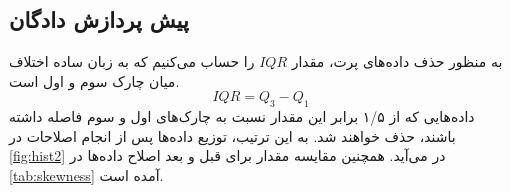 \documentclass[11pt]{article}
\begin{document}
	\subsection{پیش پردازش دادگان}
	به منظور حذف داده‌های پرت، مقدار $IQR$ را حساب می‌کنیم که به زبان ساده اختلاف میان چارک سوم و اول است.
	\begin{equation}
		IQR = Q_3 - Q_1
	\end{equation}
	داده‌هایی که از ۱/۵ برابر این مقدار نسبت به چارک‌های اول و سوم فاصله داشته باشند، حذف خواهند شد. به این ترتیب، توزیع داده‌ها پس از انجام اصلاحات در
	\autoref{fig:hist2}
	در می‌آید. همچنین مقایسه مقدار  برای قبل و بعد اصلاح داده‌ها در 
	\autoref{tab:skewness}
	آمده است. 
		\begin{figure}[!h]
		\centering

\end{figure}
\end{document}
